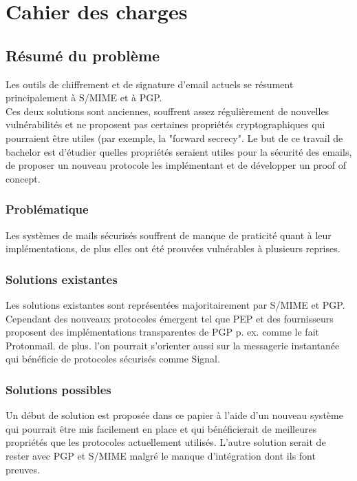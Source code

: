 \chapter{Cahier des charges}
\label{ch:cdc}
\section*{Résumé du problème}
Les outils de chiffrement et de signature d'email actuels se résument principalement à S/MIME et à PGP. \\
Ces deux solutions sont anciennes, souffrent assez régulièrement de nouvelles vulnérabilités et ne proposent pas certaines propriétés cryptographiques qui pourraient être utiles (par exemple, la "forward secrecy". Le but de ce travail de bachelor est d'étudier quelles propriétés seraient utiles pour la sécurité des emails, de proposer un nouveau protocole les implémentant et de développer un proof of concept. 
\subsection*{Problématique}
Les systèmes de mails sécurisés souffrent de manque de praticité quant à leur implémentations, de plus elles ont été prouvées vulnérables à plusieurs reprises.
\subsection*{Solutions existantes}
Les solutions existantes sont représentées majoritairement par S/MIME et PGP. Cependant des nouveaux protocoles émergent tel que PEP et des fournisseurs proposent des implémentations transparentes de PGP p. ex. comme le fait Protonmail. de plus. l'on pourrait s'orienter aussi sur la messagerie instantanée qui bénéficie de protocoles sécurisés comme Signal.
\subsection*{Solutions possibles}
Un début de solution est proposée dans ce papier à l'aide d'un nouveau système qui pourrait être mis facilement en place et qui bénéficierait de meilleures propriétés que les protocoles actuellement utilisés. L'autre solution serait de rester avec PGP et S/MIME malgré le manque d'intégration dont ils font preuves.
